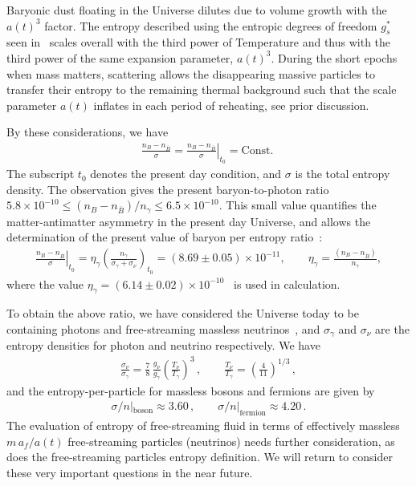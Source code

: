 Baryonic dust floating in the Universe dilutes due to volume growth with the $a(t)^3$ factor. The entropy described using the entropic degrees of freedom $g^\ast_s$ seen in~ scales overall with the third power of Temperature and thus with the third power of the same expansion parameter, $a(t)^3$. During the short epochs when mass matters, scattering allows the disappearing massive particles to transfer their entropy to the remaining thermal background such that the scale parameter $a(t)$ inflates in each period of reheating, see prior discussion. 

{\color{black} By these considerations,} we have
\begin{align}
\frac{n_B-n_{\overline{B}}}{\sigma}= \left.\frac{n_B-n_{\overline{B}}}{ \sigma}\right|_{t_0}=\mathrm{Const.}\;
\end{align}
The subscript $t_0$ denotes the present day condition, and $\sigma$ is the total entropy density.
The observation gives the present baryon-to-photon ratio~\cite{ParticleDataGroup:2022pth} $5.8 \times 10^{-10} \leqslant(n_B-n_{\overline{B}})/n_\gamma\leqslant6.5\times10^{-10}$. This small value quantifies the matter-antimatter asymmetry in the present day Universe, and allows the determination of the present value of baryon per entropy ratio~\cite{Rafelski:2019twp,Fromerth:2002wb,Fromerth:2012fe}:
\begin{align}\label{BaryonEntropyRatio}
\left.\frac{n_B-n_{\overline{B}}}{ \sigma}\right|_{t_0}=\eta_\gamma\left(\frac{n_\gamma}{\sigma_\gamma+\sigma_\nu}\right)_{\!t_0}\!\!\!\!=(8.69\pm0.05)\!\!\times\!\!10^{-11},\qquad \eta_\gamma=\frac{(n_B-n_{\overline{B}})}{n_\gamma},
\end{align}
where the value $\eta_\gamma=(6.14\pm0.02)\times10^{-10}$~\cite{ParticleDataGroup:2022pth} is used in calculation. 

To obtain the above ratio, we have considered the Universe today to be containing photons and free-streaming massless neutrinos~\cite{Birrell:2012gg}, and $\sigma_\gamma$ and $\sigma_\nu$ are the entropy densities for photon and neutrino respectively. We have
\begin{align}
 \frac{\sigma_\nu}{\sigma_\gamma}=\frac{7}{8}\,\frac{g_\nu}{g_\gamma}\left(\frac{T_\nu}{T_\gamma}\right)^3\,,\qquad\frac{T_\nu}{T_\gamma}=\left(\frac{4}{11}\right)^{1/3}
 \,,
\end{align}
and the entropy-per-particle for massless bosons and fermions are given by~\cite{Fromerth:2012fe}
\begin{align}
\sigma/n|_\mathrm{boson}\approx 3.60\,,\qquad
\sigma/n|_\mathrm{fermion}\approx 4.20\,.
\end{align}
The evaluation of entropy of free-streaming fluid in terms of effectively massless $m\,a_f/a(t)$ free-streaming particles (neutrinos) needs further consideration, as does the free-streaming particles entropy definition. We will return to consider these very important questions in the near future.
